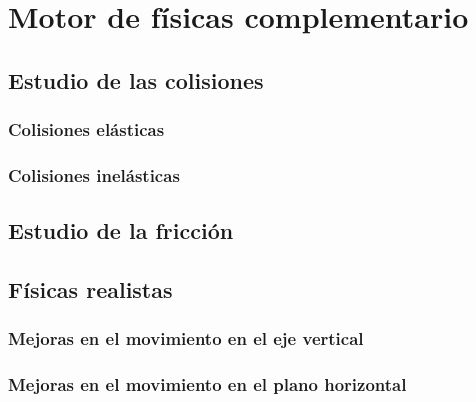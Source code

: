 \chapter{Motor de físicas complementario}
\label{chap:motor_fisicas} 

   
\section{Estudio de las colisiones}
\subsection{Colisiones elásticas}
\subsection{Colisiones inelásticas}


\section{Estudio de la fricción}

\section{Físicas realistas}
\subsection{Mejoras en el movimiento en el eje vertical}
\subsection{Mejoras en el movimiento en el plano horizontal}




